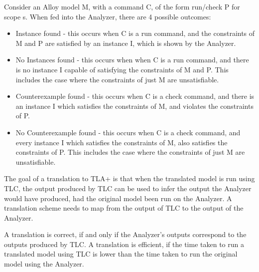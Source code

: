 Consider an Alloy model M, with a command C, of the form run/check P for scope s. When fed into the Analyzer, there are 4 possible outcomes:

\begin{itemize}
  \item Instance found - this occurs when C is a run command, and the constraints of M and P are satisfied by an instance I, which is shown by the Analyzer.
  \item No Instances found - this occurs when when C is a run command, and there is no instance I capable of satisfying the constraints of M and P. This includes the case where the constraints of just M are unsatisfiable. 
  \item Counterexample found - this occurs when C is a check command, and there is an instance I which satisfies the constraints of M, and violates the constraints of P.
  \item No Counterexample found - this occurs when C is a check command, and every instance I which satisfies the constraints of M, also satisfies the constraints of P. This includes the case where the constraints of just M are unsatisfiable. 
\end{itemize}

The goal of a translation to TLA+ is that when the translated model is run using TLC, the output produced by TLC can be used to infer the output the Analyzer would have produced, had the original model been run on the Analyzer. A translation scheme needs to map from the output of TLC to the output of the Analyzer.


A translation is correct, if and only if the Analyzer's outputs correspond to the outputs produced by TLC. A translation is efficient, if the time taken to run a translated model using TLC is lower than the time taken to run the original model using the Analyzer.